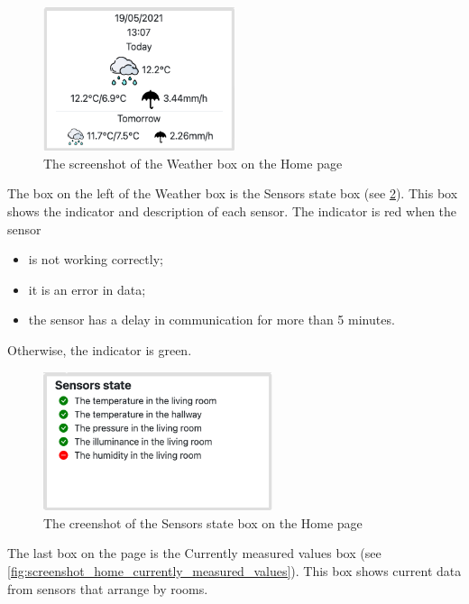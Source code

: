 \begin{figure}[H]
    \centering
    \includegraphics[width=0.5\textwidth]{img/screenshot_home_weather.png}
    \caption{The screenshot of the Weather box on the Home page}
    \label{fig:screenshot_home_weather}
\end{figure}

The box on the left of the Weather box is the Sensors state box (see \cref{fig:screenshot_home_sensors_state}). This box shows the indicator and description of each sensor. The indicator is red when the sensor

\begin{itemize}
    \item is not working correctly;
    \item it is an error in data;
    \item the sensor has a delay in communication for more than 5 minutes.
\end{itemize}

Otherwise, the indicator is green.

\begin{figure}[H]
    \centering
    \includegraphics[width=0.6\textwidth]{img/screenshot_home_sensors_state.png}
    \caption{The creenshot of the Sensors state box on the Home page}
    \label{fig:screenshot_home_sensors_state}
\end{figure}

The last box on the page is the Currently measured values box (see \cref{fig:screenshot_home_currently_measured_values}). This box shows current data from sensors that arrange by rooms.

